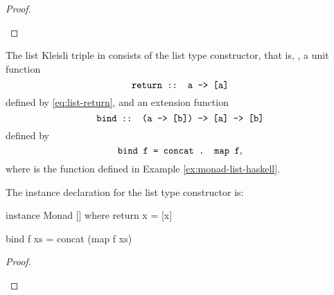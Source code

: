 \begin{example}
\begin{proof}
    \begin{steps}
    \end{steps}

  \end{proof}

\end{example}

\begin{example}
  \label{ex:triple-list-haskell}

  The list Kleisli triple in \hask consists of the list type
  constructor, that is, \texthaskell{[]}, a unit function
  \begin{equation*}
    \text{\texttt{return :: a -> [a]}}
  \end{equation*}
  defined by \eqref{eq:list-return}, and an extension function
  \begin{equation*}
    \text{\texttt{bind :: (a -> [b]) -> [a] -> [b]}}
  \end{equation*}
  defined by
  \begin{equation}
    \label{eq:list-bind}
    \text{\texttt{bind f = concat . map f}}
    \text{,}
  \end{equation}
  where  is the function defined in Example
  \ref{ex:monad-list-haskell}.

  The instance declaration for the list type constructor is:

  \begin{codehaskell}
instance Monad [] where
  return x = [x]

  bind f xs = concat (map f xs)
  \end{codehaskell}

  \begin{proof}

    \hfill
    \begin{steps}
      \steph{[]}
    \end{steps}

    \begin{steps}
        \eqbyih
        \eqbydefh{(++)}
    \end{steps}


\end{proof}
\end{example}
